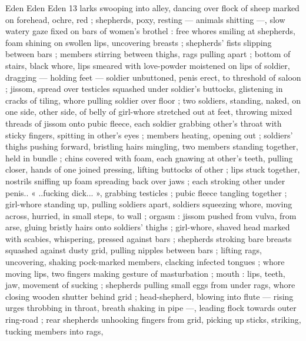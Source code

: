 Eden Eden Eden 13
larks swooping into alley, dancing over flock of sheep marked on
forehead, ochre, red ; shepherds, poxy, resting — animals shitting
—, slow watery gaze fixed on bars of women's brothel : free whores
smiling at shepherds, foam shining on swollen lips, uncovering
breasts ; shepherds’ fists slipping between bars ; members stirring
between thighs, rags pulling apart ; bottom of stairs, black whore,
lips smeared with love-powder moistened on lips of soldier, dragging
— holding feet — soldier unbuttoned, penis erect, to threshold of
saloon ; jissom, spread over testicles squashed under soldier's
buttocks, glistening in cracks of tiling, whore pulling soldier over
floor ; two soldiers, standing, naked, on one side, other side, of belly
of girl-whore stretched out at feet, throwing mixed threads of jissom
onto pubic fleece, each soldier grabbing other's throat with sticky
fingers, spitting in other's eyes ; members heating, opening out ;
soldiers’ thighs pushing forward, bristling hairs mingling, two
members standing together, held in bundle ; chins covered with
foam, each gnawing at other's teeth, pulling closer, hands of one
joined pressing, lifting buttocks of other ; lips stuck together, nostrils
sniffing up foam spreading back over jaws ; each stroking other
under penis.. « ..fucking dick... », grabbing testicles ; pubic fleece
tangling together ; girl-whore standing up, pulling soldiers apart,
soldiers squeezing whore, moving across, hurried, in small steps, to
wall ; orgasm : jissom pushed from vulva, from arse, gluing bristly
hairs onto soldiers’ thighs ; girl-whore, shaved head marked with
scabies, whispering, pressed against bars ; shepherds stroking bare
breasts squashed against dusty grid, pulling nipples between bars ;
lifting rags, uncovering, shaking pock-marked members, clacking
infected tongues ; whore moving lips, two fingers making gesture of
masturbation ; mouth : lips, teeth, jaw, movement of sucking ;
shepherds pulling small eggs from under rags, whore closing
wooden shutter behind grid ; head-shepherd, blowing into flute —
rising urges throbbing in throat, breath shaking in pipe —, leading
flock towards outer ring-road ; rear shepherds unhooking fingers
from grid, picking up sticks, striking, tucking members into rags,

